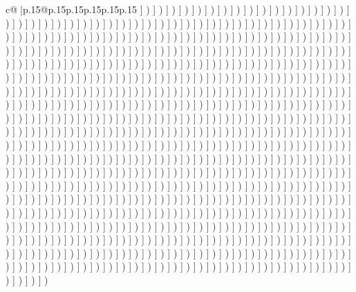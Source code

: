 \documentclass{article}
\begin{document}
{\begin{supertabular}{c@{$\;$}|p{.15\linewidth}@{}p{.15\linewidth}p{.15\linewidth}p{.15\linewidth}p{.15\linewidth}p{.15\linewidth}}
{{{{]} ) {]} ) {]} ) {]} ) {]} ) {]} ) {]} ) {]} ) {]} ) {]} ) {]} ) {]} ) {]} ) {]} ) {]} ) {]} ) {]} ) {]} ) {]} ) {]} ) {]} ) {]} ) {]} ) {]} ) {]} ) {]} ) {]} ) {]} ) {]} ) {]} ) {]} ) {]} ) {]} ) {]} ) {]} ) {]} ) {]} ) {]} ) {]} ) {]} ) {]} ) {]} ) {]} ) {]} ) {]} ) {]} ) {]} ) {]} ) {]} ) {]} ) {]} ) {]} ) {]} ) {]} ) {]} ) {]} ) {]} ) {]} ) {]} ) {]} ) {]} ) {]} ) {]} ) {]} ) {]} ) {]} ) {]} ) {]} ) {]} ) {]} ) {]} ) {]} ) {]} ) {]} ) {]} ) {]} ) {]} ) {]} ) {]} ) {]} ) {]} ) {]} ) {]} ) {]} ) {]} ) {]} ) {]} ) {]} ) {]} ) {]} ) {]} ) {]} ) {]} ) {]} ) {]} ) {]} ) {]} ) {]} ) {]} ) {]} ) {]} ) {]} ) {]} ) {]} ) {]} ) {]} ) {]} ) {]} ) {]} ) {]} ) {]} ) {]} ) {]} ) {]} ) {]} ) {]} ) {]} ) {]} ) {]} ) {]} ) {]} ) {]} ) {]} ) {]} ) {]} ) {]} ) {]} ) {]} ) {]} ) {]} ) {]} ) {]} ) {]} ) {]} ) {]} ) {]} ) {]} ) {]} ) {]} ) {]} ) {]} ) {]} ) {]} ) {]} ) {]} ) {]} ) {]} ) {]} ) {]} ) {]} ) {]} ) {]} ) {]} ) {]} ) {]} ) {]} ) {]} ) {]} ) {]} ) {]} ) {]} ) {]} ) {]} ) {]} ) {]} ) {]} ) {]} ) {]} ) {]} ) {]} ) {]} ) {]} ) {]} ) {]} ) {]} ) {]} ) {]} ) {]} ) {]} ) {]} ) {]} ) {]} ) {]} ) {]} ) {]} ) {]} ) {]} ) {]} ) {]} ) {]} ) {]} ) {]} ) {]} ) {]} ) {]} ) {]} ) {]} ) {]} ) {]} ) {]} ) {]} ) {]} ) {]} ) {]} ) {]} ) {]} ) {]} ) {]} ) {]} ) {]} ) {]} ) {]} ) {]} ) {]} ) {]} ) {]} ) {]} ) {]} ) {]} ) {]} ) {]} ) {]} ) {]} ) {]} ) {]} ) {]} ) {]} ) {]} ) {]} ) {]} ) {]} ) {]} ) {]} ) {]} ) {]} ) {]} ) {]} ) {]} ) {]} ) {]} ) {]} ) {]} ) {]} ) {]} ) {]} ) {]} ) {]} ) {]} ) {]} ) {]} ) {]} ) {]} ) {]} ) {]} ) {]} ) {]} ) {]} ) {]} ) {]} ) {]} ) {]} ) {]} ) {]} ) {]} ) {]} ) {]} ) {]} ) {]} ) {]} ) {]} ) {]} ) {]} ) {]} ) {]} ) {]} ) {]} ) {]} ) {]} ) {]} ) {]} ) {]} ) {]} ) {]} ) {]} ) {]} ) {]} ) {]} ) {]} ) {]} ) {]} ) {]} ) {]} ) {]} ) {]} ) {]} ) {]} ) {]} ) {]} ) {]} ) {]} ) {]} ) {]} ) {]} ) {]} ) {]} ) {]} ) {]} ) {]} ) {]} ) {]} ) {]} ) {]} ) {]} ) {]} ) {]} ) {]} ) {]} ) {]} ) {]} ) {]} ) {]} ) {]} ) {]} ) {]} ) {]} ) {]} ) {]} ) {]} ) {]} ) {]} ) {]} ) {]} ) {]} ) {]} ) {]} ) {]} ) {]} ) {]} ) {]} ) {]} ) {]} ) {]} ) {]} ) {]} ) {]} ) {]} ) {]} ) {]} ) {]} ) {]} ) {]} ) {]} ) {]} ) {]} ) {]} ) {]} ) {]} ) {]} ) {]} ) {]} ) {]} ) {]} ) {]} ) {]} ) {]} ) {]} ) {]} ) {]} ) {]} ) {]} ) {]} ) {]} ) {]} ) {]} ) {]} ) {]} ) {]} ) {]} ) {]} ) {]} ) {]} ) {]} ) {]} ) {]} ) {]} ) {]} ) {]} ) {]} ) {]} ) {]} ) {]} ) {]} ) {]} ) {]} ) {]} ) {]} ) {]} ) {]} ) {]} ) {]} ) {]} ) {]} ) {]} ) {]} ) {]} ) {]} ) {]} ) {]} ) {]} ) {]} ) {]} ) {]} ) {]} ) {]} ) {]} ) {]} ) {]} ) {]} ) {]} ) {]} ) {]} ) {]} ) {]} ) {]} ) {]} ) {]} ) {]} ) {]} ) {]} ) {]} ) {]} ) {]} ) {]} ) {]} ) {]} ) {]} ) {]} ) {]} ) {]} ) {]} ) {]} ) {]} ) {]} ) {]} ) {]} ) {]} ) {]} ) {]} ) {]} ) {]} ) {]} ) {]} ) {]} ) {]} ) {]} ) {]} ) {]} ) {]} ) {]} ) {]} ) {]} ) {]} ) {]} ) {]} ) {]} ) {]} ) {]} ) {]} ) {]} ) {]} ) {]} ) {]} ) {]} ) {]} ) {]} ) {]} ) {]} ) {]} ) {]} ) {]} ) {]} ) {]} ) {]} ) {]} ) {]} ) {]} ) {]} ) {]} ) {]} ) {]} ) {]} ) {]} ) {]} ) {]} ) {]} ) {]} ) {]} ) {]} ) {]} ) {]} ) {]} ) {]} ) {]} ) {]} ) {]} ) {]} ) {]} ) {]} ) {]} ) {]} ) {]} ) {]} ) {]} ) {]} ) {]} ) {]} ) {]} ) {]} ) {]} ) {]} ) {]} ) {]} ) {]} ) {]} ) {]} ) {]} ) {]} ) {]} ) {]} ) {]} ) {]} ) {]} ) {]} ) }}}
\end{supertabular}}
\end{document}
